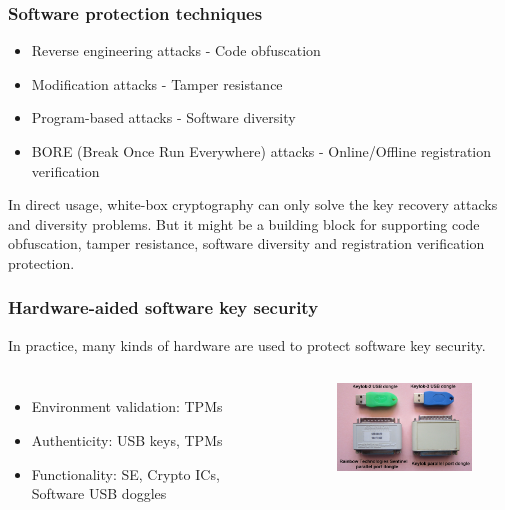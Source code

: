 \documentclass{beamer}
\begin{document}
\frame
{
\frametitle{Software protection techniques}
\begin{itemize}
\item \textcolor[rgb]{1.00, 0.00, 0.00}{Reverse engineering attacks} - \textcolor[rgb]{0.00,1.00,0.00}{Code obfuscation}

\item \textcolor[rgb]{1.00, 0.00, 0.00}{Modification attacks} - \textcolor[rgb]{0.00,1.00,0.00}{Tamper resistance}

\item \textcolor[rgb]{1.00, 0.00, 0.00}{Program-based attacks} - \textcolor[rgb]{0.00,1.00,0.00}{Software diversity}

\item \textcolor[rgb]{1.00, 0.00, 0.00}{BORE (Break Once Run Everywhere) attacks} - \textcolor[rgb]{0.00,1.00,0.00}{Online/Offline registration verification}
\end{itemize}

In direct usage, \textcolor[rgb]{1.00, 0.00, 0.00}{white-box cryptography} can only solve the key recovery attacks and diversity problems. But it might be a building 
block for supporting code obfuscation, tamper resistance, software diversity and registration verification protection.
}

\frame
{
\frametitle{Hardware-aided software key security}
In practice, many kinds of hardware are used to protect software \textcolor[rgb]{1.00, 0.00, 0.00}{key security}.
\begin{columns}[c]
\begin{itemize}
\setlength{\itemsep}{12pt}
\item Environment validation: TPMs
\item Authenticity: USB keys, TPMs
\item Functionality: SE, Crypto ICs, Software USB doggles
\end{itemize}
\begin{figure}[htbp]
\centering
  \includegraphics[width=4.8cm]{./pics/dongles.jpg}
\end{figure}

\end{columns}
}
\end{document}
